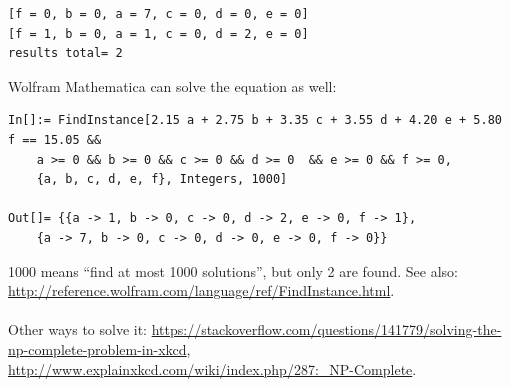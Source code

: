 \begin{lstlisting}
[f = 0, b = 0, a = 7, c = 0, d = 0, e = 0]
[f = 1, b = 0, a = 1, c = 0, d = 2, e = 0]
results total= 2
\end{lstlisting}

Wolfram Mathematica can solve the equation as well:

\begin{lstlisting}
In[]:= FindInstance[2.15 a + 2.75 b + 3.35 c + 3.55 d + 4.20 e + 5.80 f == 15.05 && 
	a >= 0 && b >= 0 && c >= 0 && d >= 0  && e >= 0 && f >= 0, 
	{a, b, c, d, e, f}, Integers, 1000]

Out[]= {{a -> 1, b -> 0, c -> 0, d -> 2, e -> 0, f -> 1},
	{a -> 7, b -> 0, c -> 0, d -> 0, e -> 0, f -> 0}}
\end{lstlisting}

1000 means ``find at most 1000 solutions'', but only 2 are found.
See also: \url{http://reference.wolfram.com/language/ref/FindInstance.html}.\\
\\
Other ways to solve it:
\url{https://stackoverflow.com/questions/141779/solving-the-np-complete-problem-in-xkcd},
\url{http://www.explainxkcd.com/wiki/index.php/287:_NP-Complete}.

